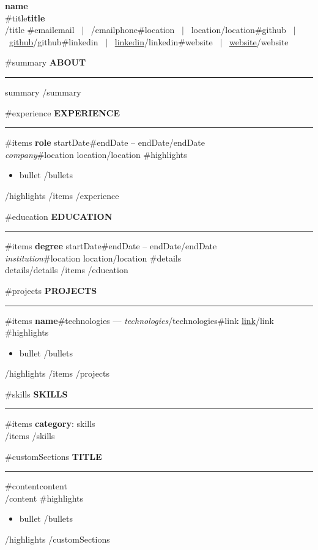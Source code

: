 \documentclass[10pt,letterpaper]{article}
\newcommand{\resumesection}[1]{%
  \vspace{6pt}%
  {\large\textbf{\uppercase{#1}}}%
  \vspace{2pt}\hrule\vspace{4pt}%
}
\begin{document}
\pagestyle{empty}

{\LARGE \textbf{{{name}}}} \\
{{#title}}{\textbf{{{title}}}} \\{{/title}}
\small {{#email}}{{email}} \ $\vert$ \ {{/email}}{{phone}}{{#location}} \ $\vert$ \ {{location}}{{/location}}{{#github}} \ $\vert$ \ \href{https://{{github}}}{{{github}}}{{/github}}{{#linkedin}} \ $\vert$ \ \href{https://{{linkedin}}}{{{linkedin}}}{{/linkedin}}{{#website}} \ $\vert$ \ \href{{{website}}}{{{website}}}{{/website}}

{{#summary}}
\resumesection{About}
{{summary}}
{{/summary}}

{{#experience}}
\resumesection{Experience}
{{#items}}
\textbf{{{role}}} \hfill {{startDate}}{{#endDate}} -- {{endDate}}{{/endDate}} \\
\textit{{{company}}}{{#location}} \hfill {{location}}{{/location}}
{{#highlights}}
\begin{itemize}[leftmargin=1.2em,noitemsep,topsep=1pt]
{{#bullets}}
  \item {{bullet}}
{{/bullets}}
\end{itemize}
{{/highlights}}
\vspace{2pt}
{{/items}}
{{/experience}}

{{#education}}
\resumesection{Education}
{{#items}}
\textbf{{{degree}}} \hfill {{startDate}}{{#endDate}} -- {{endDate}}{{/endDate}} \\
\textit{{{institution}}}{{#location}} \hfill {{location}}{{/location}}
{{#details}}\\\small {{details}}{{/details}}
\vspace{2pt}
{{/items}}
{{/education}}

{{#projects}}
\resumesection{Projects}
{{#items}}
\textbf{{{name}}}{{#technologies}} --- \textit{{{technologies}}}{{/technologies}}{{#link}} \hfill \href{{{link}}}{{{link}}}{{/link}}
{{#highlights}}
\begin{itemize}[leftmargin=1.2em,noitemsep,topsep=1pt]
{{#bullets}}
  \item {{bullet}}
{{/bullets}}
\end{itemize}
{{/highlights}}
\vspace{2pt}
{{/items}}
{{/projects}}

{{#skills}}
\resumesection{Skills}
{{#items}}
\textbf{{{category}}}: {{skills}} \\
{{/items}}
{{/skills}}

{{#customSections}}
\resumesection{{{title}}}
{{#content}}{{content}} \\{{/content}}
{{#highlights}}
\begin{itemize}[leftmargin=1.2em,noitemsep,topsep=1pt]
{{#bullets}}
  \item {{bullet}}
{{/bullets}}
\end{itemize}
{{/highlights}}
{{/customSections}}
\end{document}
